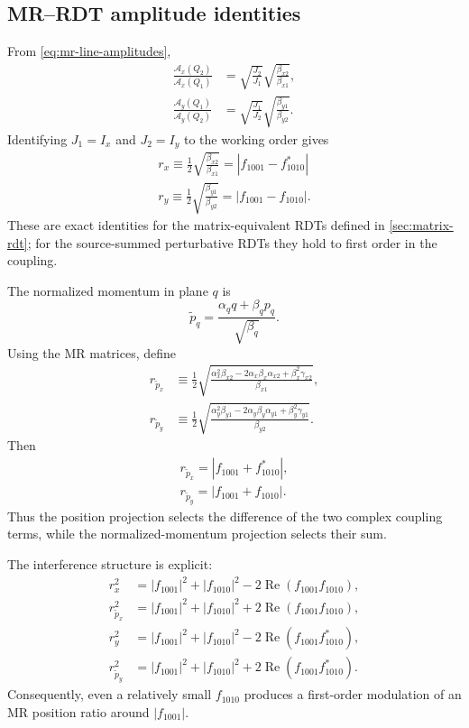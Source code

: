 \documentclass[11pt,a4paper]{article}
\newcommand{\Ree}{\operatorname{Re}}
\newcommand{\fminus}{f_{1001}}
\newcommand{\fplus}{f_{1010}}
\begin{document}
\subsection{MR--RDT amplitude identities}

From \cref{eq:mr-line-amplitudes},
\begin{align}
 \frac{\mathcal A_x(Q_2)}{\mathcal A_x(Q_1)}
 &=\sqrt{\frac{J_2}{J_1}}
   \sqrt{\frac{\beta_{x2}}{\beta_{x1}}},\\
 \frac{\mathcal A_y(Q_1)}{\mathcal A_y(Q_2)}
 &=\sqrt{\frac{J_1}{J_2}}
   \sqrt{\frac{\beta_{y1}}{\beta_{y2}}}.
\end{align}
Identifying $J_1=I_x$ and $J_2=I_y$ to the working order gives
\begin{align}
 \boxed{
 r_x\equiv\frac12\sqrt{\frac{\beta_{x2}}{\beta_{x1}}}
 =|f_{1001}-f_{1010}^{*}|
 }
 \label{eq:rx-main}\\
 \boxed{
 r_y\equiv\frac12\sqrt{\frac{\beta_{y1}}{\beta_{y2}}}
 =|f_{1001}-f_{1010}|
 .}
 \label{eq:ry-main}
\end{align}
These are exact identities for the matrix-equivalent RDTs defined in \cref{sec:matrix-rdt}; for the source-summed perturbative RDTs they hold to first order in the coupling.

The normalized momentum in plane $q$ is
\begin{equation}
 \widetilde p_q=\frac{\alpha_q q+\beta_q p_q}{\sqrt{\beta_q}}.
\end{equation}
Using the MR matrices, define
\begin{align}
 r_{\widetilde p_x}
 &\equiv\frac12
 \sqrt{
  \frac{
   \alpha_x^2\beta_{x2}
   -2\alpha_x\beta_x\alpha_{x2}
   +\beta_x^2\gamma_{x2}
  }{\beta_{x1}}
 },
 \label{eq:rpx-mr}\\
 r_{\widetilde p_y}
 &\equiv\frac12
 \sqrt{
  \frac{
   \alpha_y^2\beta_{y1}
   -2\alpha_y\beta_y\alpha_{y1}
   +\beta_y^2\gamma_{y1}
  }{\beta_{y2}}
 }.
 \label{eq:rpy-mr}
\end{align}
Then
\begin{align}
 \boxed{r_{\widetilde p_x}=|f_{1001}+f_{1010}^{*}|,}
 \label{eq:rpx-rdt}\\
 \boxed{r_{\widetilde p_y}=|f_{1001}+f_{1010}|.}
 \label{eq:rpy-rdt}
\end{align}
Thus the position projection selects the difference of the two complex coupling terms, while the normalized-momentum projection selects their sum.

The interference structure is explicit:
\begin{align}
 r_x^2&=|\fminus|^2+|\fplus|^2-2\Ree(\fminus\fplus),\\
 r_{\widetilde p_x}^2&=|\fminus|^2+|\fplus|^2+2\Ree(\fminus\fplus),\\
 r_y^2&=|\fminus|^2+|\fplus|^2-2\Ree(\fminus\fplus^{*}),\\
 r_{\widetilde p_y}^2&=|\fminus|^2+|\fplus|^2+2\Ree(\fminus\fplus^{*}).
 \label{eq:interference-identities}
\end{align}
Consequently, even a relatively small $f_{1010}$ produces a first-order modulation of an MR position ratio around $|f_{1001}|$.
\end{document}
